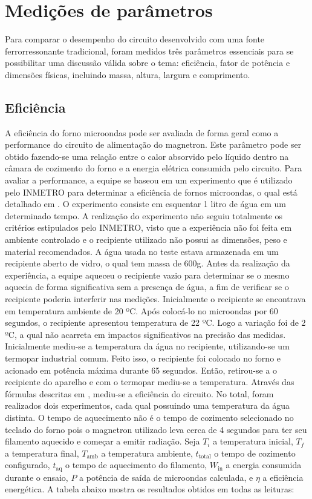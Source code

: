 \section{Medições de parâmetros}
\label{sec:mesaures}
Para comparar o desempenho do circuito desenvolvido com uma fonte ferrorressonante tradicional, foram medidos três parâmetros essenciais para se possibilitar uma discussão válida sobre o tema: eficiência, fator de potência e dimensões físicas, incluindo massa, altura, largura e comprimento. 

\subsection{Eficiência}
A eficiência do forno microondas pode ser avaliada de forma geral como a performance do circuito de alimentação do magnetron. Este parâmetro pode ser obtido fazendo-se uma relação entre o calor absorvido pelo líquido dentro na câmara de cozimento do forno e a energia elétrica consumida pelo circuito.
Para avaliar a performance, a equipe se baseou em um experimento que é utilizado pelo INMETRO para determinar a eficiência de fornos microondas, o qual está detalhado em . O experimento consiste em esquentar 1 litro de água em um determinado tempo. A realização do experimento não seguiu totalmente os critérios estipulados pelo INMETRO, visto que a experiência não foi feita em ambiente controlado e o recipiente utilizado não possui as dimensões, peso e material recomendados. A água usada no teste estava armazenada em um recipiente aberto de vidro, o qual tem massa de 600g. Antes da realização da experiência, a equipe aqueceu o recipiente vazio para determinar se o mesmo aquecia de forma significativa sem a presença de água, a fim de verificar se o recipiente poderia interferir nas medições. Inicialmente o recipiente se encontrava em temperatura ambiente de 20 ºC. Após colocá-lo no microondas por 60 segundos, o recipiente apresentou temperatura de 22 ºC. Logo a variação foi de 2 ºC, a qual não acarreta em impactos significativos na precisão das medidas.
Inicialmente mediu-se a temperatura da água no recipiente, utilizando-se um termopar industrial comum. Feito isso, o recipiente foi colocado no forno e acionado em potência máxima durante 65 segundos. Então, retirou-se a o recipiente do aparelho e com o termopar mediu-se a temperatura. Através das fórmulas descritas em , mediu-se a eficiência do circuito. No total, foram realizados dois experimentos, cada qual possuindo uma temperatura da água distinta. O tempo de aquecimento não é o tempo de cozimento selecionado no teclado do forno pois o magnetron utilizado leva cerca de 4 segundos para ter seu filamento aquecido e começar a emitir radiação. Seja $T_i$ a temperatura inicial, $T_f$ a temperatura final, $T_\mathrm{amb}$ a temperatura ambiente, $t_\mathrm{total}$ o tempo de cozimento configurado, $t_\mathrm{aq}$  o tempo de aquecimento do filamento,  $W_\mathrm{in}$ a energia consumida durante o ensaio, $P$ a potência de saída de microondas calculada, e $\eta$ a eficiência energética. A tabela abaixo mostra os resultados obtidos em todas as leituras:

